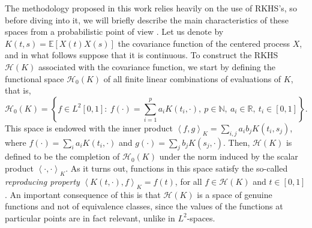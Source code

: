 \documentclass{article}
\numberwithin{equation}{section}
\theoremstyle{plain}
\newcommand{\N}{\mathbb{N}}
\newcommand{\R}{\mathbb{R}}
\newcommand{\Hcal}{\mathcal{H}}
\newcommand\dotprod[2]{\left\langle#1,#2\right\rangle}
\begin{document}
The methodology proposed in this work relies heavily on the use of RKHS's, so before diving into it, we will briefly describe the main characteristics of these spaces from a probabilistic point of view \citep[for a more detailed account, see for example][]{berlinet2004reproducing}. Let us denote by \(K(t, s)= \mathbb E[X(t)X(s)]\) the covariance function of the centered process \(X\), and in what follows suppose that it is continuous. To construct the RKHS \(\Hcal(K)\) associated with the covariance function, we start by defining the functional space \(\Hcal_0(K)\) of all finite linear combinations of evaluations of \(K\), that is,
\begin{equation}\label{eq:h0}
  \Hcal_0(K) = \left\{ f \in L^2[0,1]: \ f(\cdot) = \sum_{i=1}^p a_i K(t_i, \cdot), \ p \in \N, \ a_i \in \R, \ t_i \in [0, 1] \right\}.
\end{equation}
This space is endowed with the inner product \(\dotprod{f}{g}_K = \sum_{i, j} a_i b_j K(t_i, s_j)\), where \(f(\cdot)=\sum_i a_i K(t_i, \cdot) \) and \(g(\cdot)=\sum_j b_j K(s_j, \cdot)\). Then, \(\Hcal(K)\) is defined to be the completion of \(\Hcal_0(K)\) under the norm induced by the scalar product \(\dotprod{\cdot}{\cdot}_K\). As it turns out, functions in this space satisfy the so-called \textit{reproducing property} \(\dotprod{K(t, \cdot)}{f}_K = f(t)\), for all \(f \in \Hcal(K)\) and \(t \in [0, 1]\). An important consequence of this is that \(\Hcal(K)\) is a space of genuine functions and not of equivalence classes, since the values of the functions at particular points are in fact relevant, unlike in \(L^2\)-spaces.
\end{document}
